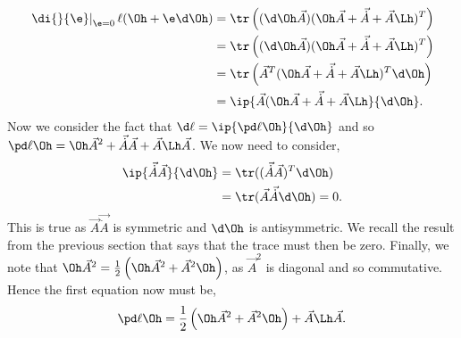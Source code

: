 \begin{align*}
  \left.\di{}{\e}\right|_{\e = 0}\ell (\Oh + \e\d\Oh) &= \tr\left( (\d\Oh \vec A) (\Oh \vec A + \vec {\dot A} + \vec A\Lh)^T \right)\\
   &= \tr\left( (\d\Oh \vec A) (\Oh \vec A + \vec {\dot A} + \vec A\Lh)^T \right)\\
   &= \tr\left( \vec A^T(\Oh \vec A + \vec {\dot A} + \vec A\Lh)^T\d\Oh \right)\\
   &= \ip{\vec A(\Oh \vec A + \vec {\dot A} + \vec A\Lh}{\d\Oh}.
\end{align*}
Now we consider the fact that $\displaystyle{\d\ell = \ip{\pd \ell \Oh}{\d\Oh}}$ and so $\displaystyle{\pd \ell \Oh = \Oh \vec A^2 + \vec {\dot A}\vec A + \vec A\Lh\vec A}$. We now need to consider,
\begin{align*}
  \ip{\vec{\dot A}\vec A}{\d\Oh} &= \tr((\vec{\dot A}\vec A)^T\d\Oh) \\
  &= \tr (\vec A\vec{\dot A}\d\Oh) = 0.
\end{align*}
This is true as $\vec A\vec{\dot A}$ is symmetric and $\d\Oh$ is antisymmetric. We recall the result from the previous section that says that the trace must then be zero. Finally, we note that $\Oh \vec A^2 = \frac{1}{2}\left(\Oh \vec A^2 + \vec A^2\Oh\right)$, as $\vec A^2$ is diagonal and so commutative. Hence the first equation now must be,
\begin{align}
  \pd \ell \Oh = \frac{1}{2}\left(\Oh \vec A^2 + \vec A^2\Oh\right) + \vec A\Lh\vec A.
\end{align}

